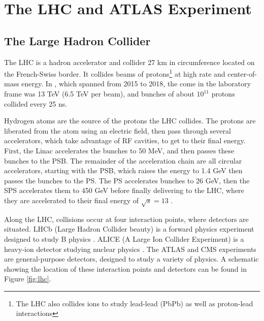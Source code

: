 \chapter{The LHC and ATLAS Experiment}

\section{The Large Hadron Collider}
The \gls{LHC} \cite{lhc} is a hadron accelerator and collider 27 km in circumference located on the French-Swiss border. It collides beams of protons\footnote{The LHC also collides ions to study lead-lead (PbPb) as well as proton-lead interactions} at high rate and center-of-mass energy. In \RunTwo, which spanned from 2015 to 2018, the \gls{come} in the laboratory frame was 13 TeV (6.5 TeV per beam), and bunches of about $10^{11}$ protons collided every 25 ns.

Hydrogen atoms are the source of the protons the \gls{LHC} collides. The protons are liberated from the atom using an electric field, then pass through several accelerators, which take advantage of \gls{RF} cavities, to get to their final energy. First, the \gls{Linac} accelerates the bunches to 50 MeV, and then passes these bunches to the \gls{PSB}. The remainder of the acceleration chain are all circular accelerators, starting with the \gls{PSB}, which raises the energy to 1.4 GeV then passes the bunches to the \gls{PS}. The \gls{PS} accelerates bunches to 26 GeV, then the \gls{SPS} accelerates them to 450 GeV before finally delivering to the \gls{LHC}, where they are accelerated to their final energy of $\sqrt{s} = 13 $ \TeV.


Along the \gls{LHC}, collisions occur at four interaction points, where detectors are situated. LHCb (Large Hadron Collider beauty) is a forward physics experiment designed to study B physics \cite{lhcb}. ALICE (A Large Ion Collider Experiment) is a heavy-ion detector studying nuclear physics \cite{alice}. The ATLAS \cite{atlas-experiment} and \gls{CMS} \cite{cms} experiments are general-purpose detectors, designed to study a variety of physics. A schematic showing the location of these interaction points and detectors can be found in Figure \ref{fig:lhc}.

